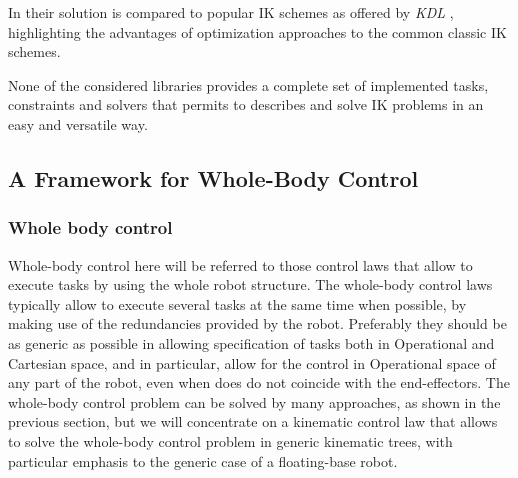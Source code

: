 In \cite{Beeson15} their solution is compared to popular IK schemes as offered by \emph{KDL} \cite{Smits2011-db}, highlighting the advantages of optimization approaches to the common classic IK schemes.

None of the considered libraries provides a complete set of implemented tasks, constraints and solvers that permits to describes and solve IK problems in an easy and versatile way.

\subsection{A Framework for Whole-Body Control}
\subsubsection{Whole body control}
\label{sec:walkman_wholebody}
Whole-body control here will be referred to those control laws that allow to execute tasks by using the whole robot structure. The whole-body control laws typically allow to execute several tasks at the same time when possible,  by making use of the redundancies provided by the robot. Preferably they should be as generic as possible in allowing specification of tasks both in Operational and Cartesian space, and in particular, allow for the control in Operational space of any part of the robot, even when does do not coincide with the end-effectors. The whole-body control  problem can be solved by many approaches, as shown in the previous section, but we will concentrate on a kinematic control law that allows to solve the whole-body control problem  in generic kinematic trees, with particular emphasis to the generic case of a floating-base robot.

